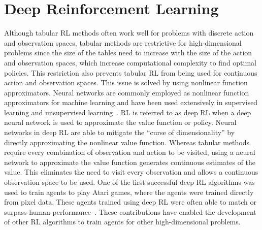 \section{Deep Reinforcement Learning}
\label{sec:deep_RL_overview}
Although tabular RL methods often work well for problems with discrete action and observation spaces, tabular methods are restrictive for high-dimensional problems since the size of the tables need to increase with the size of the action and observation spaces, which increase computational complexity to find optimal policies. This restriction also prevents tabular RL from being used for continuous action and observation spaces. 
This issue is solved by using nonlinear function approximators.
Neural networks are commonly employed as nonlinear function approximators for machine learning and have been used extensively in supervised learning and unsupervised learning~\cite{Alloghani:2020a}. RL is referred to as deep RL when a deep neural network is used to approximate the value function or policy. Neural networks in deep RL are able to mitigate the ``curse of dimensionality'' by directly approximating the nonlinear value function.
%
Whereas tabular methods require every combination of observation and action to be visited, using a neural network to approximate the value function generates continuous estimates of the value. This eliminates the need to visit every observation and allows a continuous observation space to be used.
%
One of the first successful deep RL algorithms was used to train agents to play Atari games, where the agents were trained directly from pixel data. These agents trained using deep RL were often able to match or surpass human performance~\cite{Mnih:2015a,Shao:2019a}.
%
These contributions have enabled the development of other RL algorithms to train agents for other high-dimensional problems.

